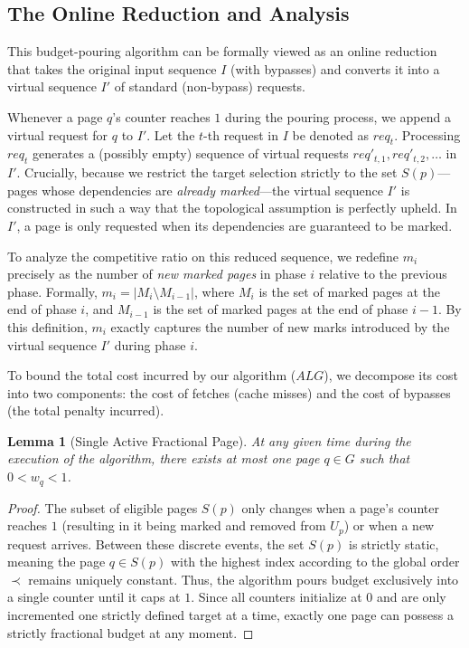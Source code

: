 \documentclass[a4paper]{article}
\newtheorem{lemma}{Lemma}      %
\begin{document}
\subsection*{The Online Reduction and Analysis}

This budget-pouring algorithm can be formally viewed as an online reduction that takes the original input sequence $I$ (with bypasses) and converts it into a virtual sequence $I'$ of standard (non-bypass) requests. 

Whenever a page $q$'s counter reaches $1$ during the pouring process, we append a virtual request for $q$ to $I'$. Let the $t$-th request in $I$ be denoted as $req_t$. Processing $req_t$ generates a (possibly empty) sequence of virtual requests $req'_{t,1}, req'_{t,2}, \ldots$ in $I'$. Crucially, because we restrict the target selection strictly to the set $S(p)$—pages whose dependencies are \textit{already marked}—the virtual sequence $I'$ is constructed in such a way that the topological assumption is perfectly upheld. In $I'$, a page is only requested when its dependencies are guaranteed to be marked.

To analyze the competitive ratio on this reduced sequence, we redefine $m_i$ precisely as the number of \textit{new marked pages} in phase $i$ relative to the previous phase. Formally, $m_i = |M_i \setminus M_{i-1}|$, where $M_i$ is the set of marked pages at the end of phase $i$, and $M_{i-1}$ is the set of marked pages at the end of phase $i-1$. By this definition, $m_i$ exactly captures the number of new marks introduced by the virtual sequence $I'$ during phase $i$.

To bound the total cost incurred by our algorithm ($ALG$), we decompose its cost into two components: the cost of fetches (cache misses) and the cost of bypasses (the total penalty incurred). 

\begin{lemma}[Single Active Fractional Page]
\label{lemma:single_fractional}
At any given time during the execution of the algorithm, there exists at most one page $q \in G$ such that $0 < w_q < 1$.
\end{lemma}
\begin{proof}
The subset of eligible pages $S(p)$ only changes when a page's counter reaches $1$ (resulting in it being marked and removed from $U_p$) or when a new request arrives. Between these discrete events, the set $S(p)$ is strictly static, meaning the page $q \in S(p)$ with the highest index according to the global order $\prec$ remains uniquely constant. Thus, the algorithm pours budget exclusively into a single counter until it caps at $1$. Since all counters initialize at $0$ and are only incremented one strictly defined target at a time, exactly one page can possess a strictly fractional budget at any moment.
\end{proof}
\end{document}
